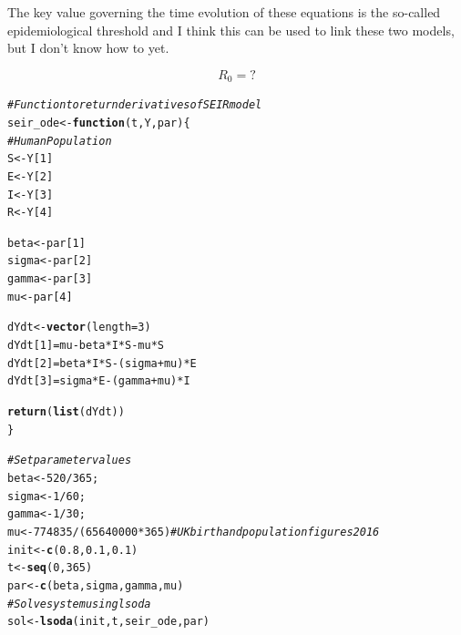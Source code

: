 \documentclass{article}\usepackage[]{graphicx}\usepackage[]{color}
\makeatletter
\newcommand{\hlnum}[1]{\textcolor[rgb]{0.686,0.059,0.569}{#1}}%
\newcommand{\hlcom}[1]{\textcolor[rgb]{0.678,0.584,0.686}{\textit{#1}}}%
\newcommand{\hlopt}[1]{\textcolor[rgb]{0,0,0}{#1}}%
\newcommand{\hlstd}[1]{\textcolor[rgb]{0.345,0.345,0.345}{#1}}%
\newcommand{\hlkwa}[1]{\textcolor[rgb]{0.161,0.373,0.58}{\textbf{#1}}}%
\newcommand{\hlkwb}[1]{\textcolor[rgb]{0.69,0.353,0.396}{#1}}%
\newcommand{\hlkwc}[1]{\textcolor[rgb]{0.333,0.667,0.333}{#1}}%
\newcommand{\hlkwd}[1]{\textcolor[rgb]{0.737,0.353,0.396}{\textbf{#1}}}%
\newenvironment{kframe}{%
 \def\at@end@of@kframe{}%
 \ifinner\ifhmode%
  \def\at@end@of@kframe{\end{minipage}}%
  \begin{minipage}{\columnwidth}%
 \fi\fi%
 \def\FrameCommand##1{\hskip\@totalleftmargin \hskip-\fboxsep
 \colorbox{shadecolor}{##1}\hskip-\fboxsep
     \hskip-\linewidth \hskip-\@totalleftmargin \hskip\columnwidth}%
 \MakeFramed {\advance\hsize-\width
   \@totalleftmargin\z@ \linewidth\hsize
   \@setminipage}}%
 {\par\unskip\endMakeFramed%
 \at@end@of@kframe}
\newenvironment{knitrout}{}{} %
\makeatother
\begin{document}
The key value governing the time evolution of these equations is the so-called epidemiological threshold and I think this can be used to link these two models, but I don't know how to yet.

\begin{equation}
 R_0= ?
\end{equation}


\begin{knitrout}
\color{fgcolor}\begin{kframe}
\begin{alltt}
\hlcom{# Function to return derivatives of SEIR model}
\hlstd{seir_ode}\hlkwb{<-}\hlkwa{function}\hlstd{(}\hlkwc{t}\hlstd{,}\hlkwc{Y}\hlstd{,}\hlkwc{par}\hlstd{)\{}
\hlcom{# Human Population}
  \hlstd{S}\hlkwb{<-}\hlstd{Y[}\hlnum{1}\hlstd{]}
  \hlstd{E}\hlkwb{<-}\hlstd{Y[}\hlnum{2}\hlstd{]}
  \hlstd{I}\hlkwb{<-}\hlstd{Y[}\hlnum{3}\hlstd{]}
  \hlstd{R}\hlkwb{<-}\hlstd{Y[}\hlnum{4}\hlstd{]}

  \hlstd{beta}\hlkwb{<-}\hlstd{par[}\hlnum{1}\hlstd{]}
  \hlstd{sigma}\hlkwb{<-}\hlstd{par[}\hlnum{2}\hlstd{]}
  \hlstd{gamma}\hlkwb{<-}\hlstd{par[}\hlnum{3}\hlstd{]}
  \hlstd{mu}\hlkwb{<-}\hlstd{par[}\hlnum{4}\hlstd{]}

  \hlstd{dYdt}\hlkwb{<-}\hlkwd{vector}\hlstd{(}\hlkwc{length}\hlstd{=}\hlnum{3}\hlstd{)}
  \hlstd{dYdt[}\hlnum{1}\hlstd{]}\hlkwb{=}\hlstd{mu}\hlopt{-}\hlstd{beta}\hlopt{*}\hlstd{I}\hlopt{*}\hlstd{S}\hlopt{-}\hlstd{mu}\hlopt{*}\hlstd{S}
  \hlstd{dYdt[}\hlnum{2}\hlstd{]}\hlkwb{=}\hlstd{beta}\hlopt{*}\hlstd{I}\hlopt{*}\hlstd{S}\hlopt{-}\hlstd{(sigma}\hlopt{+}\hlstd{mu)}\hlopt{*}\hlstd{E}
  \hlstd{dYdt[}\hlnum{3}\hlstd{]}\hlkwb{=}\hlstd{sigma}\hlopt{*}\hlstd{E}\hlopt{-}\hlstd{(gamma}\hlopt{+}\hlstd{mu)}\hlopt{*}\hlstd{I}

  \hlkwd{return}\hlstd{(}\hlkwd{list}\hlstd{(dYdt))}
\hlstd{\}}


\hlcom{# Set parameter values}
\hlstd{beta}\hlkwb{<-}\hlnum{520}\hlopt{/}\hlnum{365}\hlstd{;}
\hlstd{sigma}\hlkwb{<-}\hlnum{1}\hlopt{/}\hlnum{60}\hlstd{;}
\hlstd{gamma}\hlkwb{<-}\hlnum{1}\hlopt{/}\hlnum{30}\hlstd{;}
\hlstd{mu}\hlkwb{<-}\hlnum{774835}\hlopt{/}\hlstd{(}\hlnum{65640000}\hlopt{*}\hlnum{365}\hlstd{)} \hlcom{# UK birth and population figures 2016}
\hlstd{init}\hlkwb{<-}\hlkwd{c}\hlstd{(}\hlnum{0.8}\hlstd{,}\hlnum{0.1}\hlstd{,}\hlnum{0.1}\hlstd{)}
\hlstd{t}\hlkwb{<-}\hlkwd{seq}\hlstd{(}\hlnum{0}\hlstd{,}\hlnum{365}\hlstd{)}
\hlstd{par}\hlkwb{<-}\hlkwd{c}\hlstd{(beta,sigma,gamma,mu)}
\hlcom{# Solve system using lsoda}
\hlstd{sol}\hlkwb{<-}\hlkwd{lsoda}\hlstd{(init,t,seir_ode,par)}


\end{alltt}
\end{kframe}
\end{knitrout}
\end{document}
